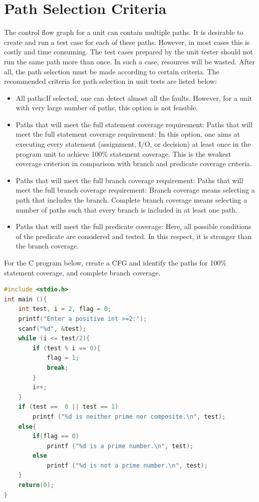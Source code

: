 \section{Path Selection Criteria}
The control flow graph for a unit can contain multiple paths. It is desirable to create and run a test case for each of these paths. However, in most cases this is costly and time consuming. The test cases prepared by the unit tester should not run the same path more than once. In such a case, resources will be wasted. After all, the path selection must be made according to certain criteria. The recommended criteria for path selection in unit tests are listed below:
\begin{itemize}
        \item All paths:If selected, one can detect almost all the faults. However, for a unit with very large number of paths, this option is not feasible. 
        \item Paths that will meet the full statement coverage requirement: Paths that will meet the full statement coverage requirement: In this option, one aims at executing every statement (assignment, I/O, or decision) at least once in the program unit to achieve 100\% statement coverage. This is the weakest coverage criterion in comparison with branch and predicate coverage criteria.
        \item Paths that will meet the full branch coverage requirement: Paths that will meet the full branch coverage requirement: Branch coverage means selecting a path that includes the branch. Complete branch coverage means selecting a number of paths such that every branch is included in at least one path.
        \item Paths that will meet the full predicate coverage: Here, all possible conditions of the predicate are considered and tested. In this respect, it is stronger than the branch coverage.
\end{itemize}
\begin{example}
For the C program below, create a CFG and identify the paths for 100\% statement coverage, and complete branch coverage.
\begin{lstlisting}[language=C, caption={A C program to test if a number is prime or not.}]
#include <stdio.h>
int main (){
	int test, i = 2, flag = 0;
	printf("Enter a positive int >=2:");
	scanf("%d", &test);
	while (i <= test/2){
		if (test % i == 0){
			flag = 1;
			break;
		}
		i++;
	}
	if (test ==  0 || test == 1)
		printf ("%d is neither prime nor composite.\n", test);
	else{
		if(flag == 0)
			printf ("%d is a prime number.\n", test);
		else
			printf ("%d is not a prime number.\n", test);
	}
	return(0);
}
\end{lstlisting}
\end{example}

